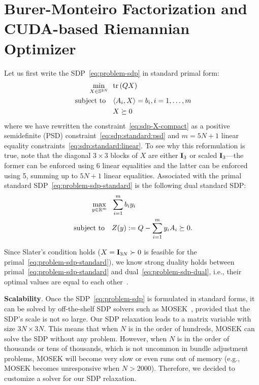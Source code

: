 
\section{Burer-Monteiro Factorization and \\ CUDA-based Riemannian Optimizer}
\label{sec:implementation}

Let us first write the SDP~\eqref{eq:problem-sdp} in standard primal form:
\begin{subequations}\label{eq:problem-sdp-standard}
    \begin{align} 
        \min_{X \in \mathbb{S}^{3N}} & \ \ \mathrm{tr}\left(QX\right) \\
        \text{ subject to } & \ \ \langle A_i,X \rangle = b_i, i = 1,\dots,m \label{eq:sdp:standard:linear}\\
        & \ \ X \succeq 0  \label{eq:sdp:standard:psd}
        \end{align}
\end{subequations}
where we have rewritten the constraint~\eqref{eq:sdp-X-compact} as a positive semidefinite (PSD) constraint~\eqref{eq:sdp:standard:psd} and $m=5N+1$ linear equality constraints~\eqref{eq:sdp:standard:linear}. To see why this reformulation is true, note that the diagonal $3\times 3$ blocks of $X$ are either ${\mathbf I}_3$ or scaled ${\mathbf I}_3$---the former can be enforced using 6 linear equalities and the latter can be enforced using 5, summing up to $5N+1$ linear equalities. Associated with the primal standard SDP~\eqref{eq:problem-sdp-standard} is the following dual standard SDP:
\begin{subequations}\label{eq:problem-sdp-dual}
    \begin{align} 
    \max_{y \in { {\mathbb R}^{m} }} & \ \ \sum_{i=1}^{m} b_i y_i \\
    \text{ subject to } & \ \ Z(y) := Q - \sum_{i=1}^{m} y_i A_i \succeq 0. \label{eq:Zofy}
    \end{align} 
\end{subequations}

Since Slater's condition holds ($X = {\mathbf I}_{3N} \succ 0$ is feasible for the primal~\eqref{eq:problem-sdp-standard}), we know strong duality holds between primal~\eqref{eq:problem-sdp-standard} and dual~\eqref{eq:problem-sdp-dual}, i.e., their optimal values are equal to each other~\cite{yang24book-sdp}.  

\textbf{Scalability}. Once the SDP~\eqref{eq:problem-sdp} is formulated in standard forms, it can be solved by off-the-shelf SDP solvers such as MOSEK~\cite{aps2019mosek}, provided that the SDP's scale is not so large. Our SDP relaxation leads to a matrix variable with size $3 N \times 3N$. This means that when $N$ is in the order of hundreds, MOSEK can solve the SDP without any problem. However, when $N$ is in the order of thousands or tens of thousands, which is not uncommon in bundle adjustment problems, MOSEK will become very slow or even runs out of memory (e.g., MOSEK becomes unresponsive when $N>2000$). Therefore, we decided to customize a solver for our SDP relaxation.


